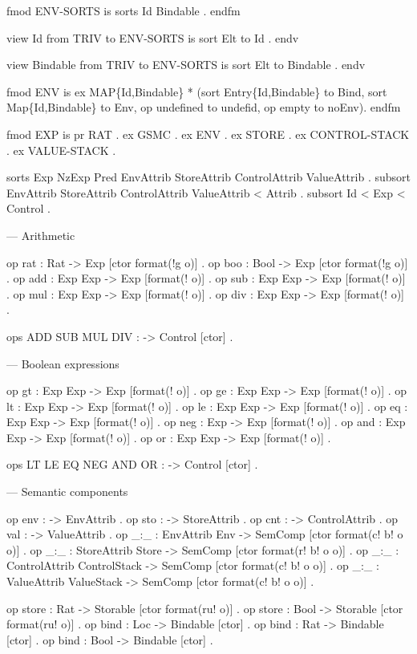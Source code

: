 \documentclass{llncs}%
\begin{document}
fmod ENV-SORTS is
    sorts Id Bindable . 
endfm

view Id from TRIV to ENV-SORTS is sort Elt to Id . endv

view Bindable from TRIV to ENV-SORTS is sort Elt to Bindable . endv

fmod ENV is
    ex MAP\{Id,Bindable\} * (sort Entry\{Id,Bindable\} to Bind,
       sort Map\{Id,Bindable\} to Env,
       op undefined to undefid, op empty to noEnv). 
endfm
\nwendcode{}\nwdocspar

\nwenddocs{}\endmoddef\nwstartdeflinemarkup\nwenddeflinemarkup
fmod EXP is
    pr RAT .
    ex GSMC .  ex ENV .
    ex STORE . ex CONTROL-STACK .
    ex VALUE-STACK .

    sorts Exp NzExp Pred EnvAttrib StoreAttrib ControlAttrib ValueAttrib .
    subsort EnvAttrib StoreAttrib ControlAttrib ValueAttrib < Attrib  .
    subsort Id < Exp < Control .

    --- Arithmetic

    op rat : Rat -> Exp [ctor format(!g o)] .
    op boo : Bool -> Exp [ctor format(!g o)] .
    op add : Exp Exp -> Exp [format(! o)] .
    op sub : Exp Exp -> Exp [format(! o)] .
    op mul : Exp Exp -> Exp [format(! o)] .
    op div : Exp Exp -> Exp [format(! o)] .

    ops ADD SUB MUL DIV : -> Control [ctor] .

    --- Boolean expressions

    op gt : Exp Exp -> Exp [format(! o)] .
    op ge : Exp Exp -> Exp [format(! o)] .
    op lt : Exp Exp -> Exp [format(! o)] .
    op le : Exp Exp -> Exp [format(! o)] .
    op eq : Exp Exp -> Exp [format(! o)] .
    op neg : Exp -> Exp [format(! o)] .
    op and : Exp Exp -> Exp [format(! o)] .
    op or : Exp Exp -> Exp [format(! o)] .

    ops LT LE EQ NEG AND OR : -> Control [ctor] .

    --- Semantic components

    op env : -> EnvAttrib .
    op sto : -> StoreAttrib .
    op cnt : -> ControlAttrib .
    op val : -> ValueAttrib .
    op _:_ : EnvAttrib Env -> SemComp [ctor format(c! b! o o)] .
    op _:_ : StoreAttrib Store -> SemComp [ctor format(r! b! o o)] .
    op _:_ : ControlAttrib ControlStack -> SemComp [ctor format(c! b! o o)] .
    op _:_ : ValueAttrib ValueStack -> SemComp [ctor format(c! b! o o)] .

    op store : Rat -> Storable [ctor format(ru! o)] .
    op store : Bool -> Storable [ctor format(ru! o)] .
    op bind : Loc -> Bindable [ctor] .
    op bind : Rat -> Bindable [ctor] .
    op bind : Bool -> Bindable [ctor] .
\end{document}
